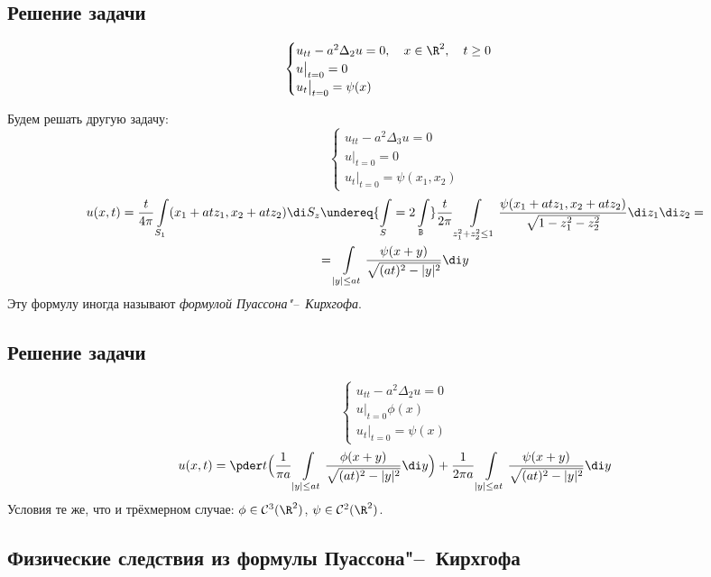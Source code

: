 \subsection{Решение задачи }

$$
\begin{cases}
	u_{tt} - a^2 \Delta_2 u = 0, \quad x \in \R^2, \quad t \ge 0 \\
	u\bigr|_{t = 0} = 0 \\
	u_t\bigr|_{t = 0} = \psi(x)
\end{cases} $$

Будем решать другую задачу:
$$
\begin{cases}
	u_{tt} - a^2 \Delta_3 u = 0 \\
	u\bigr|_{t = 0} = 0 \\
	u_t\bigr|_{t = 0} = \psi(x_1, x_2)
\end{cases} $$
\begin{multline*}
	u(x, t) = \frac t{4\pi} \int\limits_{S_1} (x_1 + atz_1, x_2 + atz_2) \di S_z
	\undereq{\int\limits_{S} = 2\int\limits_{\mathtt B}}
	\frac t{2\pi} \int\limits_{z_1^2 + z_2^2 \le 1} \frac{\psi(x_1 + atz_1, x_2 + atz_2)}
	{\sqrt{1 - z_1^2 - z_2^2}} \di z_1 \di z_2 = \\
	= \int\limits_{|y| \le at} \frac{\psi(x + y)}{\sqrt{(at)^2 - |y|^2}} \di y
\end{multline*}
Эту формулу иногда называют \emph{формулой Пуассона"--~Кирхгофа}.

\subsection{Решение задачи }

$$
\begin{cases}
	u_{tt} - a^2 \Delta_2 u = 0 \\
	u\bigr|_{t = 0} \phi(x) \\
	u_t\bigr|_{t = 0} = \psi(x)
\end{cases} $$
$$ u(x, t) = \pder t \Bigl( \frac1{\pi a} \int\limits_{|y| \le at}
\frac{\phi(x + y)}{\sqrt{(at)^2 - |y|^2}} \di y \Bigr) +
\frac1{2 \pi a} \int\limits_{|y| \le at} \frac{\psi(x + y)}{\sqrt{(at)^2 - |y|^2}} \di y $$
Условия те же, что и трёхмерном случае: $ \phi \in \mathcal C^3(\R^2) $, $ \psi \in
\mathcal C^2(\R^2) $.

\subsection{Физические следствия из формулы Пуассона\texorpdfstring{"--~}{--}Кирхгофа}

